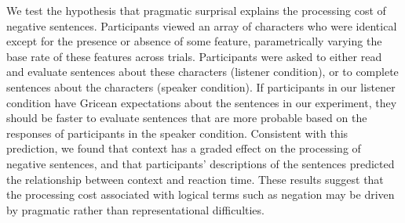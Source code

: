 \documentclass[man]{apa2}
\begin{document}


We test the hypothesis that pragmatic surprisal explains the processing cost of negative sentences.  Participants viewed an array of characters who were identical except for the presence or absence of some feature, parametrically varying the base rate of these features across trials.  Participants were asked to either read and evaluate sentences about these characters (listener condition), or to complete sentences about the characters (speaker condition).  If participants in our listener condition have Gricean expectations about the sentences in our experiment, they should be faster to evaluate sentences that are more probable based on the responses of participants in the speaker condition.  Consistent with this prediction, we found that context has a graded effect on the processing of negative sentences, and that participants' descriptions of the sentences predicted the relationship between context and reaction time.  These results suggest that the processing cost associated with logical terms such as negation may be driven by pragmatic rather than representational difficulties.
\end{document}
